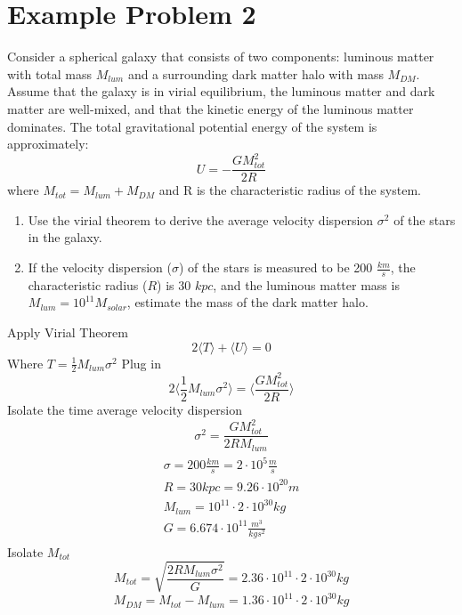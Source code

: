 \documentclass[12pt]{article}
\begin{document}
\section{Example Problem 2}
    Consider a spherical galaxy that consists of two components: luminous matter with total mass $M_{lum}$ and a surrounding dark matter halo with mass $M_{DM}$. Assume that the galaxy is in virial equilibrium, the luminous matter and dark matter are well-mixed, and that the kinetic energy of the luminous matter dominates. 
    The total gravitational potential energy of the system is approximately: 
    \[
        U = - \frac{G M_{tot}^2}{2 R}
    \]
    where $M_{tot} = M_{lum} + M_{DM}$ and R is the characteristic radius of the system. 
    \begin{enumerate}
        \item Use the virial theorem to derive the average velocity dispersion $\sigma^2$ of the stars in the galaxy. 
        \item If the velocity dispersion ($\sigma$) of the stars is measured to be 200 $\frac{km}{s}$, the characteristic radius ($R$) is 30 $kpc$, and the luminous matter mass is $M_{lum} = 10^{11} M_{solar}$, estimate the mass of the dark matter halo. 
    \end{enumerate}

    \newline Apply Virial Theorem
    \[
        2 \langle T \rangle  + \langle U \rangle = 0
    \]
    Where $T = \frac{1}{2} M_{lum} \sigma^2$
    \newline Plug in
    \[
        2 \langle \frac{1}{2} M_{lum} \sigma^2 \rangle = \langle \frac{G M_{tot}^2}{2 R} \rangle
    \]
    Isolate the time average velocity dispersion
    \[
        \boxed{\sigma^2 = \frac{G M_{tot}^2}{2 R M_{lum}}}
    \]
    \begin{gather*}
        \begin{split}
            \sigma = 200 \frac{km}{s} = 2 \cdot 10^5 \frac{m}{s}
            \\
            R = 30 kpc = 9.26 \cdot 10^20 m
            \\
            M_{lum} = 10^{11} \cdot 2 \cdot 10^{30} kg
            \\
            G = 6.674 \cdot 10^{11} \frac{m^3}{kg s^2}
        \end{split}
    \end{gather*}
    Isolate $M_{tot}$
    \[
        M_{tot} = \sqrt{\frac{2 R M_{lum} \sigma^2}{G}} = 2.36 \cdot 10^{11} \cdot 2 \cdot 10^{30} kg
    \]
    \[
        M_{DM} = M_{tot} - M_{lum} = 1.36 \cdot 10^{11} \cdot 2 \cdot 10^{30} kg
    \]
\end{document}
